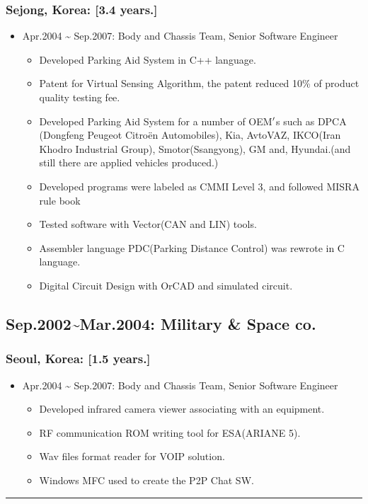 \documentclass[12pt,a4paper]{article}
\begin{document}
\subsubsection{Sejong, Korea: [3.4 years.]}
\begin{itemize}
\item Apr.2004 {\textasciitilde} Sep.2007: Body and Chassis Team, Senior Software Engineer

\begin{itemize}
\item Developed Parking Aid System in C++ language.


\item Patent for Virtual Sensing Algorithm, the patent reduced 10\% of product quality testing fee.


\item Developed Parking Aid System for a number of OEM\ensuremath{\rq}s such as DPCA (Dongfeng Peugeot Citroën Automobiles), Kia, AvtoVAZ, IKCO(Iran Khodro Industrial Group), Smotor(Ssangyong), GM and, Hyundai.(and still there are applied vehicles produced.)


\item Developed programs were labeled as CMMI Level 3, and followed MISRA rule book


\item Tested software with Vector(CAN and LIN) tools.


\item Assembler language PDC(Parking Distance Control) was rewrote in C language.


\item Digital Circuit Design with OrCAD and simulated circuit.

\end{itemize}
\end{itemize}
\subsection{Sep.2002{\textasciitilde}Mar.2004: Military \& Space co.}
\subsubsection{Seoul, Korea: [1.5 years.]}
\begin{itemize}
\item Apr.2004 {\textasciitilde} Sep.2007: Body and Chassis Team, Senior Software Engineer

\begin{itemize}
\item Developed infrared camera viewer associating with an equipment.


\item RF communication ROM writing tool for ESA(ARIANE 5).


\item Wav files format reader for VOIP solution.


\item Windows MFC used to create the P2P Chat SW. 

\end{itemize}
\end{itemize}
\rule{\textwidth}{1pt}
\end{document}
